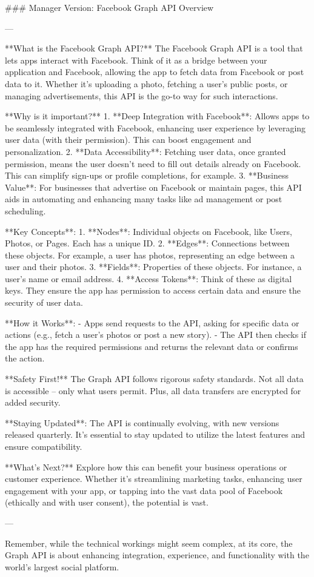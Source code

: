 ### Manager Version: Facebook Graph API Overview

---

**What is the Facebook Graph API?**  
The Facebook Graph API is a tool that lets apps interact with Facebook. Think of it as a bridge between your application and Facebook, allowing the app to fetch data from Facebook or post data to it. Whether it's uploading a photo, fetching a user's public posts, or managing advertisements, this API is the go-to way for such interactions.

**Why is it important?**  
1. **Deep Integration with Facebook**: Allows apps to be seamlessly integrated with Facebook, enhancing user experience by leveraging user data (with their permission). This can boost engagement and personalization.
2. **Data Accessibility**: Fetching user data, once granted permission, means the user doesn’t need to fill out details already on Facebook. This can simplify sign-ups or profile completions, for example.
3. **Business Value**: For businesses that advertise on Facebook or maintain pages, this API aids in automating and enhancing many tasks like ad management or post scheduling.

**Key Concepts**:  
1. **Nodes**: Individual objects on Facebook, like Users, Photos, or Pages. Each has a unique ID.
2. **Edges**: Connections between these objects. For example, a user has photos, representing an edge between a user and their photos.
3. **Fields**: Properties of these objects. For instance, a user's name or email address.
4. **Access Tokens**: Think of these as digital keys. They ensure the app has permission to access certain data and ensure the security of user data.

**How it Works**:
- Apps send requests to the API, asking for specific data or actions (e.g., fetch a user's photos or post a new story).
- The API then checks if the app has the required permissions and returns the relevant data or confirms the action.

**Safety First!**  
The Graph API follows rigorous safety standards. Not all data is accessible – only what users permit. Plus, all data transfers are encrypted for added security.

**Staying Updated**:
The API is continually evolving, with new versions released quarterly. It's essential to stay updated to utilize the latest features and ensure compatibility.

**What's Next?**  
Explore how this can benefit your business operations or customer experience. Whether it's streamlining marketing tasks, enhancing user engagement with your app, or tapping into the vast data pool of Facebook (ethically and with user consent), the potential is vast.

--- 

Remember, while the technical workings might seem complex, at its core, the Graph API is about enhancing integration, experience, and functionality with the world's largest social platform.